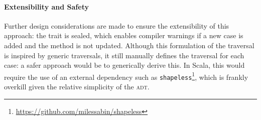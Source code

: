 \documentclass[../../../main.tex]{subfiles}
\begin{document}
\paragraph{Extensibility and Safety}
Further design considerations are made to ensure the extensibility of this approach: the  trait is sealed, which enables compiler warnings if a new  case is added and the  method is not updated.
Although this formulation of the traversal is inspired by generic traversals, it still manually defines the traversal for each case: a safer approach would be to generically derive this.
In Scala, this would require the use of an external dependency such as \texttt{shapeless}\footnote{\url{https://github.com/milessabin/shapeless}},
which is frankly overkill given the relative simplicity of the  \textsc{adt}.
\end{document}
